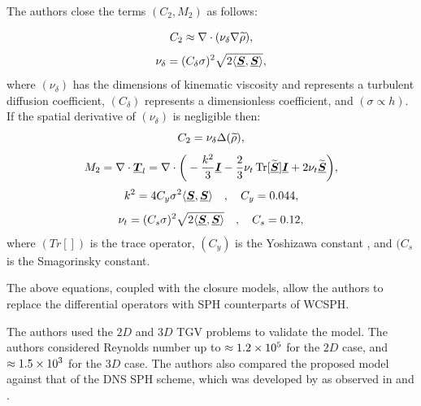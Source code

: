 The authors close the terms $(C_2, M_2)$ as follows:

\begin{equation}
    C_2 \approx \nabla \cdot (\nu_{\delta} \nabla\widetilde{\rho}),
\end{equation}
\begin{equation}
    \nu_{\delta} = (C_{\delta}\sigma)^2\sqrt{2\langle \underline{\bm{S}}, \underline{\bm{S}} \rangle},
\end{equation}
where $(\nu_{\delta})$ has the dimensions of kinematic viscosity and represents a turbulent diffusion coefficient, $(C_{\delta})$ represents a dimensionless coefficient, and $(\sigma \propto h)$. If the spatial derivative of $(\nu_{\delta})$ is negligible then:
\begin{equation}
    C_2 = \nu_{\delta} \Delta(\widetilde{\rho}),
\end{equation}
\begin{equation}
    M_2 = \nabla \cdot \underline{\bm{T}}_l = \nabla \cdot \bigg( -\frac{k^2}{3}\underline{\bm{I}} - \frac{2}{3}\nu_t \operatorname{Tr}[\widetilde{\underline{\bm{S}}}]\underline{\bm{I}} + 2\nu_t\widetilde{\underline{\bm{S}}} \bigg),
\end{equation}
\begin{equation}
    k^2 = 4 C_y \sigma^2 \langle \underline{\bm{S}}, \underline{\bm{S}} \rangle \quad , \quad C_y=0.044,
\end{equation}
\begin{equation}
    \nu_t = (C_s\sigma)^2\sqrt{2 \langle \underline{\bm{S}}, \underline{\bm{S}} \rangle} \quad , \quad C_s=0.12,
\end{equation}
where $(Tr[])$ is the trace operator, $(C_y)$ is the Yoshizawa constant \parencite{yoshizawa1986statistical}, and $(C_s$ is the Smagorinsky constant.

The above equations, coupled with the closure models, allow the authors to replace the differential operators with SPH counterparts of WCSPH.

The authors used the  $2D$ and $3D$ TGV problems to validate the model. The authors considered Reynolds number up to $\approx 1.2 \times {10}^{5}$ for the $2D$ case, and $\approx 1.5 \times {10}^{3}$ for the $3D$ case. The authors also compared the proposed model against that of the DNS SPH scheme, which was developed by \cite{mayrhofer2015dns} as observed in  and .

